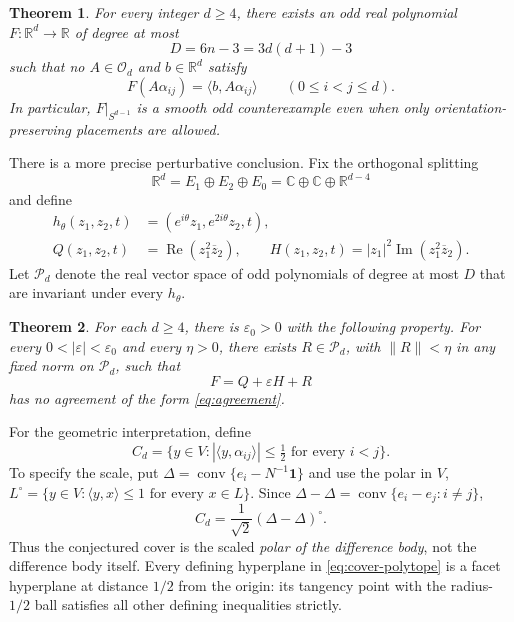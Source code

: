 \documentclass[11pt,reqno]{amsart}
\newtheorem{theorem}{Theorem}[section]
\theoremstyle{definition}
\theoremstyle{remark}
\numberwithin{equation}{section}
\newcommand{\R}{\mathbb R}
\newcommand{\C}{\mathbb C}
\newcommand{\one}{\mathbf 1}
\newcommand{\eps}{\varepsilon}
\newcommand{\Orth}{\mathcal O_d}
\newcommand{\Pol}{\mathcal P_d}
\newcommand{\ip}[2]{\langle #1,#2\rangle}
\newcommand{\norm}[1]{\lVert #1\rVert}
\DeclareMathOperator{\RePart}{Re}
\DeclareMathOperator{\ImPart}{Im}
\begin{document}
\begin{theorem}\label{thm:main}
For every integer $d\geq4$, there exists an odd real polynomial
$F:\R^d\to\R$ of degree at most
\begin{equation}\label{eq:degree-bound}
 D=6n-3=3d(d+1)-3
\end{equation}
such that no $A\in\Orth$ and $b\in\R^d$ satisfy
\begin{equation}\label{eq:agreement}
 F(A\alpha_{ij})=\ip{b}{A\alpha_{ij}}
 \qquad(0\leq i<j\leq d).
\end{equation}
In particular, $F|_{S^{d-1}}$ is a smooth odd counterexample even when
only orientation-preserving placements are allowed.
\end{theorem}

There is a more precise perturbative conclusion. Fix the orthogonal
splitting
\begin{equation}\label{eq:splitting}
 \R^d=E_1\oplus E_2\oplus E_0
      =\C\oplus\C\oplus\R^{d-4}
\end{equation}
and define
\begin{align}
 h_\theta(z_1,z_2,t)&=(e^{i\theta}z_1,e^{2i\theta}z_2,t),
       \label{eq:circle}\\
 Q(z_1,z_2,t)&=\RePart(z_1^2\overline z_2),\qquad
 H(z_1,z_2,t)=|z_1|^2\ImPart(z_1^2\overline z_2).
       \label{eq:seed}
\end{align}
Let $\Pol$ denote the real vector space of odd polynomials of degree
at most $D$ that are invariant under every $h_\theta$.

\begin{theorem}\label{thm:perturbative}
For each $d\geq4$, there is $\eps_0>0$ with the following property.
For every $0<|\eps|<\eps_0$ and every $\eta>0$, there exists
$R\in\Pol$, with $\norm R<\eta$ in any fixed norm on $\Pol$, such that
\[
 F=Q+\eps H+R
\]
has no agreement of the form \eqref{eq:agreement}.
\end{theorem}

For the geometric interpretation, define
\begin{equation}\label{eq:cover-polytope}
 C_d=\{y\in V:|\ip{y}{\alpha_{ij}}|\leq\tfrac12
                 \text{ for every }i<j\}.
\end{equation}
To specify the scale, put
$\Delta=\operatorname{conv}\{e_i-N^{-1}\one\}$ and use the polar in $V$,
$L^\circ=\{y\in V:\ip y x\leq1\text{ for every }x\in L\}$.
Since $\Delta-\Delta=\operatorname{conv}\{e_i-e_j:i\ne j\}$,
\[
 C_d=\frac1{\sqrt2}(\Delta-\Delta)^\circ.
\]
Thus the conjectured cover is the scaled \emph{polar of the difference
body}, not the difference body itself. Every defining hyperplane in
\eqref{eq:cover-polytope} is a facet hyperplane at distance $1/2$
from the origin: its tangency point with the radius-$1/2$ ball satisfies
all other defining inequalities strictly.
\end{document}
